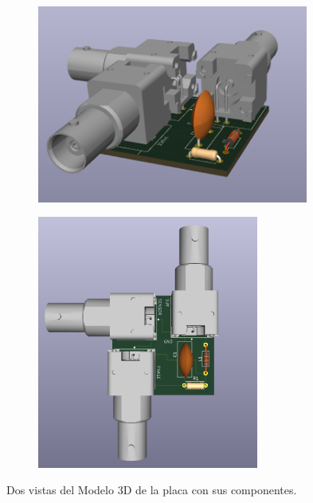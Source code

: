 




\begin{figure}[!ht]
	\begin{minipage}[c]{0.5\textwidth}
		\begin{subfigure}{\textwidth}
			\centering
			\includegraphics[width=0.98\textwidth]{Figures/02_06_2025/PCB_3D_perfil_BNC}
			\captionsetup{width=0.8\textwidth}
			\subcaption{}
		\end{subfigure}
	\end{minipage}\begin{minipage}[c]{0.49\textwidth}
		\begin{subfigure}{\textwidth}
			\centering
			\includegraphics[width=0.8\textwidth,angle=90,origin=c]{Figures/02_06_2025/PCB_3D_top_BNC}
			\captionsetup{width=0.8\textwidth}
			\subcaption{}
		\end{subfigure}
	\end{minipage}
	\caption{Dos vistas del Modelo 3D de la placa con sus componentes.}
	\label{fig:}
\end{figure}




